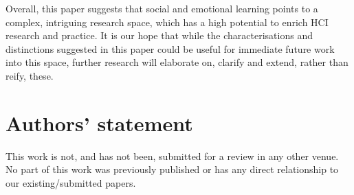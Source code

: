 \documentclass[prodmode,acmtochi]{acmsmall}
\newcommand{\todo}[1]{\textrm{\textrm{\textcolor{LightBlue}{[[#1]]}}}}
\begin{document}
Overall, this paper suggests that social and emotional learning points to a complex, intriguing research space, which has a high potential to enrich HCI research and practice.
%
It is our hope that while the characterisations and distinctions suggested in this paper could be useful for immediate future work into this space, further research will elaborate on, clarify and extend, rather than reify, these.







\bigskip

\section*{Authors' statement}
This work is not, and has not been, submitted for a review in any other venue. No part of this work was previously published or has any direct relationship to our existing/submitted papers. 
\end{document}
